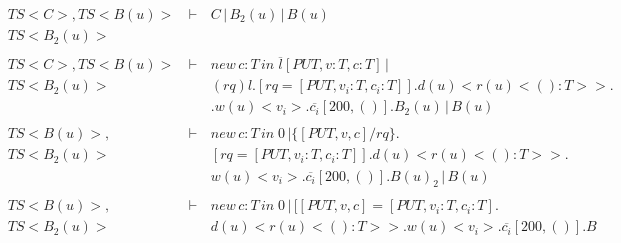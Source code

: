 \setcounter{equation}{0}
\begin{eqnarray*}
 \ TS<C>,TS<B(u)>\, &\vdash\,&  C\,|\,B_2(u)\,|\,B(u) \\
 \ TS<B_2(u)>       &        &          \\
 \               &        &          \\
 \ TS<C>,TS<B(u)>\, &\vdash\,& new\,c:T\,in\;\overline{l}[PUT,v:T,c:T]\,|\\
 \ TS<B_2(u)>       &\,      & (rq)l.[rq = [PUT,v_i:T,c_i:T]].d(u)<r(u)<():T>>.\\
 \               &\,      & .w(u)<v_i>.\overline{c_i}[200,()].B_2(u)\,|\,B(u)\\
 \               &        &          \\
 \ TS<B(u)>,         &\vdash\,& new\,c:T\,in\;0\,|\{[PUT,v,c]/rq\}.\\
 \ TS<B_2(u)>              &\,      & [rq = [PUT,v_i:T,c_i:T]].d(u)<r(u)<():T>>.\\
 \               &\,      & w(u)<v_i>.\overline{c_i}[200,()].B(u)_2\,|\,B(u)\\
 \               &        &          \\
 \ TS<B(u)>,         &\vdash\,& new\,c:T\,in\;0\,|\,[[PUT,v,c]=[PUT,v_i:T,c_i:T].\\
 \ TS<B_2(u)>              &\,      & d(u)<r(u)<():T>>.w(u)<v_i>.\overline{c_i}[200,()].B\\
\end{eqnarray*}
